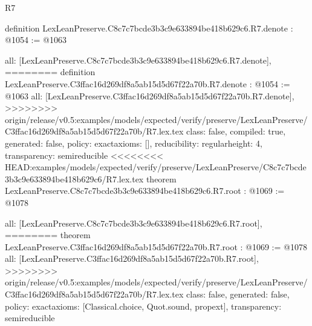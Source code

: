 \begin{lexlean}{R7}
\begin{coremodule}
{{{{{{{{{{{definition LexLeanPreserve.C8c7c7bcde3b3c9e633894be418b629c6.R7.denote : @1054 := @1063 {
  all: [LexLeanPreserve.C8c7c7bcde3b3c9e633894be418b629c6.R7.denote],
========
definition LexLeanPreserve.C3ffac16d269df8a5ab15d5d67f22a70b.R7.denote : @1054 := @1063 {
  all: [LexLeanPreserve.C3ffac16d269df8a5ab15d5d67f22a70b.R7.denote],
>>>>>>>> origin/release/v0.5:examples/models/expected/verify/preserve/LexLeanPreserve/C3ffac16d269df8a5ab15d5d67f22a70b/R7.lex.tex
  class: false,
  compiled: true,
  generated: false,
  policy: exact{axioms: []},
  reducibility: regular{height: 4},
  transparency: semireducible
}
<<<<<<<< HEAD:examples/models/expected/verify/preserve/LexLeanPreserve/C8c7c7bcde3b3c9e633894be418b629c6/R7.lex.tex
theorem LexLeanPreserve.C8c7c7bcde3b3c9e633894be418b629c6.R7.root : @1069 := @1078 {
  all: [LexLeanPreserve.C8c7c7bcde3b3c9e633894be418b629c6.R7.root],
========
theorem LexLeanPreserve.C3ffac16d269df8a5ab15d5d67f22a70b.R7.root : @1069 := @1078 {
  all: [LexLeanPreserve.C3ffac16d269df8a5ab15d5d67f22a70b.R7.root],
>>>>>>>> origin/release/v0.5:examples/models/expected/verify/preserve/LexLeanPreserve/C3ffac16d269df8a5ab15d5d67f22a70b/R7.lex.tex
  class: false,
  generated: false,
  policy: exact{axioms: [Classical.choice, Quot.sound, propext]},
  transparency: semireducible
}

}}}}}}}}}}}}}
\end{coremodule}
\end{lexlean}
